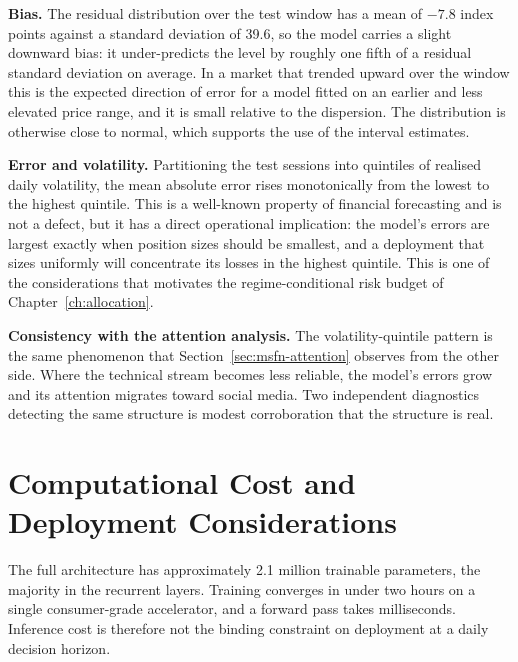 \textbf{Bias.} The residual distribution over the test window has a mean of $-7.8$ index points
against a standard deviation of 39.6, so the model carries a slight downward bias: it
under-predicts the level by roughly one fifth of a residual standard deviation on average. In a
market that trended upward over the window this is the expected direction of error for a model
fitted on an earlier and less elevated price range, and it is small relative to the dispersion.
The distribution is otherwise close to normal, which supports the use of the interval estimates.

\textbf{Error and volatility.} Partitioning the test sessions into quintiles of realised daily
volatility, the mean absolute error rises monotonically from the lowest to the highest quintile.
This is a well-known property of financial forecasting and is not a defect, but it has a direct
operational implication: the model's errors are largest exactly when position sizes should be
smallest, and a deployment that sizes uniformly will concentrate its losses in the highest
quintile. This is one of the considerations that motivates the regime-conditional risk budget of
Chapter~\ref{ch:allocation}.

\textbf{Consistency with the attention analysis.} The volatility-quintile pattern is the same
phenomenon that Section~\ref{sec:msfn-attention} observes from the other side. Where the technical
stream becomes less reliable, the model's errors grow and its attention migrates toward social
media. Two independent diagnostics detecting the same structure is modest corroboration that the
structure is real.

\section{Computational Cost and Deployment Considerations}
\label{sec:msfn-deploy}

The full architecture has approximately 2.1 million trainable parameters, the majority in the
recurrent layers. Training converges in under two hours on a single consumer-grade accelerator,
and a forward pass takes milliseconds. Inference cost is therefore not the binding constraint on
deployment at a daily decision horizon.

